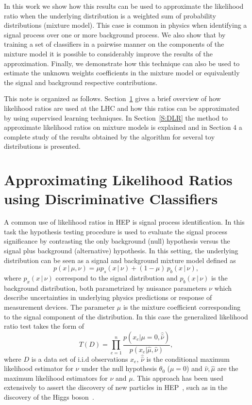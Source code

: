 \documentclass[11pt, oneside]{article}   	%
\begin{document}
In this work we show how this results can be used to approximate the likelihood ratio when the underlying distribution is a weighted sum of probability distributions (mixture model). This case is common in physics when identifying a signal process over one or more background process. We also show 
that by training a set of classifiers in a pairwise manner on the components of the mixture model it is possible to considerably improve the results of the approximation. Finally, we demonstrate how this technique can also be used to estimate the unknown weights coefficients in the mixture model or equivalently the signal and background respective contributions.

This note is organized as follows. Section~\ref{S:ALR} gives a brief overview of how likelihood ratios are used at the LHC and how this ratios can be approximated by 
using supervised learning techniques. In Section~\ref{S:DLR} the method to approximate likelihood ratios on mixture models is explained and in Section 4 a complete study of the results obtained by the algorithm for several toy distributions is presented.

\section{Approximating Likelihood Ratios using Discriminative Classifiers}\label{S:ALR}

A common use of likelihood ratios in HEP is signal process identification. In this task the hypothesis testing procedure is used to evaluate the signal process significance by contrasting the only background (null) hypothesis versus the signal plus background (alternative) hypothesis. In this setting, the underlying distribution can be seen as a signal and background mixture model defined as
\begin{equation}\label{eq:sigbkg}
p( x \,|\, \mu, \nu) =  \mu p_s( x \, |\,  \nu)  + (1-\mu)\, p_b( x \,|\, \nu) ,
\end{equation}
where $p_x(x \, |\, \nu)$ correspond to the signal distribution and $p_b(x \, |\, \nu)$ is the background distribution, both parametrized by nuisance parameters $\nu$ which describe uncertainties in underlying physics predictions or response of measurement devices. The parameter $\mu$ is the mixture coefficient corresponding to the signal component of the distribution. In this case the generalized likelihood ratio test takes the form of 
\begin{equation}
T(D) = \prod_{e=1}^n \frac{ p(x_e|\mu=0,\hat{\hat{\nu}})}{ p(x_e|\hat \mu, \hat \nu)},
\end{equation}
where $D$ is a data set of i.i.d observations $x_e$, $\hat {\hat \nu}$ is the conditional maximum likelihood estimator for $\nu$ under the null hypothesis $\theta_0$ ($\mu = 0$) and $\hat{\nu}, \hat{\mu}$ are the maximum likelihood estimators for $\nu$ and $\mu$. This approach has been used extensively to assert the discovery of new particles in HEP~\citep{Cowan:2010js}, such as in the discovery of the Higgs boson~\citep{Aad:2012tfa,Chatrchyan:2012ufa}.
\end{document}
